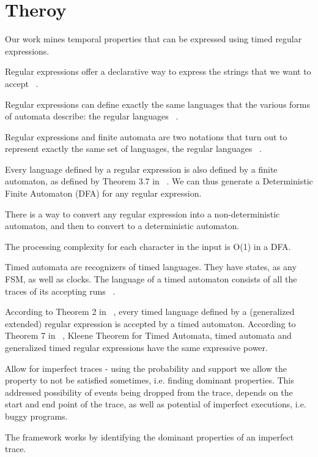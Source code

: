 \documentclass[]{sigplanconf}
\begin{document}
\section{Theroy}

Our work mines temporal properties that can be expressed using timed regular expressions. 

Regular expressions offer a declarative way to express the strings that we want to accept ~\cite{book1}. 

Regular expressions can define exactly the same languages that the various forms of automata describe: the regular languages ~\cite{book1}. 

Regular expressions and finite automata are two notations that turn out to represent exactly the same set of languages, the regular languages ~\cite{book1}. 

Every language defined by a regular expression is also defined by a finite automaton, as defined by Theorem 3.7 in ~\cite{book1}. We can thus generate a Deterministic Finite Automaton (DFA) for any regular expression.

There is a way to convert any regular expression into a non-deterministic automaton, and then to convert to a deterministic automaton. 

The processing complexity for each character in the input is O(1) in a DFA.

Timed automata are recognizers of timed languages. They have states, as any FSM, as well as clocks. 
The language of a timed automaton consists of all the traces of its accepting runs ~\cite{timedregex}.

According to Theorem 2 in ~\cite{timedregex}, every timed language defined by a (generalized extended) regular expression is accepted by a timed automaton.
According to Theorem 7 in ~\cite{timedregex}, Kleene Theorem for Timed Automata, timed automata and generalized timed regular expressions have the same expressive power. 

Allow for imperfect traces - using the probability and support we allow the property to not be satisfied sometimes, i.e. finding dominant properties. This addressed possibility of events being dropped from the trace, depends on the start and end point of the trace, as well as potential of imperfect executions, i.e. buggy programs. 

The framework works by identifying the dominant properties of an imperfect trace.
\end{document}
